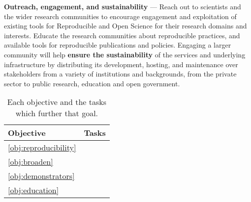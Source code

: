 \begin{compactenum}
\item \label{obj:education}
  \textbf{Outreach, engagement, and sustainability} ---
  Reach out to scientists and the wider research
  communities to encourage engagement
  and exploitation of existing tools for Reproducible and Open Science
  for their research domains and interests.
  Educate the research communities about reproducible practices,
  and available tools for reproducible publications and policies.
  Engaging a larger community will help \textbf{ensure the sustainability} of
  the services and underlying infrastructure by distributing its
  development, hosting, and maintenance over stakeholders from a
  variety of institutions and backgrounds,
  from the private sector to public research, education
  and open government.



\end{compactenum}

\begin{table}
  \label{tab:objectives-tasks}
  \caption{
  Each objective and the tasks which further that goal.}
  \begin{tabular}{|m{}|m{}|}

    \hline

    \textbf{Objective} & \textbf{Tasks}
    \\\hline

    \ref{obj:reproducibility} &


    \\\hline

    \ref{obj:broaden} &


    \\\hline

    \ref{obj:demonstrators} &

    \\\hline

    \ref{obj:education} &


    \\\hline

  \end{tabular}
\end{table}
